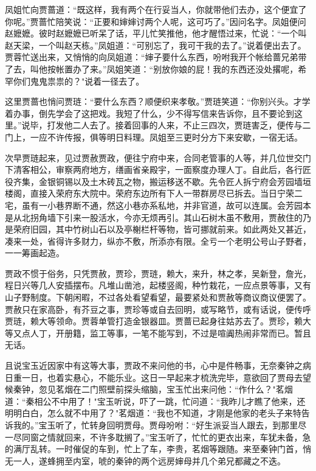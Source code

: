 凤姐忙向贾蔷道：“既这样，我有两个在行妥当人，你就带他们去办，这个便宜了你呢。”贾蔷忙陪笑说：“正要和婶婶讨两个人呢，这可巧了。”因问名字。凤姐便问赵嬷嬷。彼时赵嬷嬷已听呆了话，平儿忙笑推他，他才醒悟过来，忙说：“一个叫赵天梁，一个叫赵天栋。”凤姐道：“可别忘了，我可干我的去了。”说着便出去了。贾蓉忙送出来，又悄悄的向凤姐道：“婶子要什么东西，吩咐我开个帐给蔷兄弟带了去，叫他按帐置办了来。”凤姐笑道：“别放你娘的屁！我的东西还没处撂呢，希罕你们鬼鬼祟祟的？"说着一径去了。

这里贾蔷也悄问贾琏：“要什么东西？顺便织来孝敬。”贾琏笑道：“你别兴头。才学着办事，倒先学会了这把戏。我短了什么，少不得写信来告诉你，且不要论到这里。”说毕，打发他二人去了。接着回事的人来，不止三四次，贾琏害乏，便传与二门上，一应不许传报，俱等明日料理。凤姐至三更时分方下来安歇，一宿无话。

次早贾琏起来，见过贾赦贾政，便往宁府中来，合同老管事的人等，并几位世交门下清客相公，审察两府地方，缮画省亲殿宇，一面察度办理人丁。自此后，各行匠役齐集，金银铜锡以及土木砖瓦之物，搬运移送不歇。先令匠人拆宁府会芳园墙垣楼阁，直接入荣府东大院中。荣府东边所有下人一带群房尽已拆去。当日宁荣二宅，虽有一小巷界断不通，然这小巷亦系私地，并非官道，故可以连属。会芳园本是从北拐角墙下引来一股活水，今亦无烦再引。其山石树木虽不敷用，贾赦住的乃是荣府旧园，其中竹树山石以及亭榭栏杆等物，皆可挪就前来。如此两处又甚近，凑来一处，省得许多财力，纵亦不敷，所添亦有限。全亏一个老明公号山子野者，一一筹画起造。

贾政不惯于俗务，只凭贾赦，贾珍，贾琏，赖大，来升，林之孝，吴新登，詹光，程日兴等几人安插摆布。凡堆山凿池，起楼竖阁，种竹栽花，一应点景等事，又有山子野制度。下朝闲暇，不过各处看望看望，最要紧处和贾赦等商议商议便罢了。贾赦只在家高卧，有芥豆之事，贾珍等或自去回明，或写略节，或有话说，便传呼贾琏，赖大等领命。贾蓉单管打造金银器皿。贾蔷已起身往姑苏去了。贾珍，赖大等又点人丁，开册籍，监工等事，一笔不能写到，不过是喧阗热闹非常而已。暂且无话。

且说宝玉近因家中有这等大事，贾政不来问他的书，心中是件畅事，无奈秦钟之病日重一日，也着实悬心，不能乐业。这日一早起来才梳洗完毕，意欲回了贾母去望候秦钟，忽见茗烟在二门照壁前探头缩脑，宝玉忙出来问他：“作什么？"茗烟道：“秦相公不中用了！"宝玉听说，吓了一跳，忙问道：“我昨儿才瞧了他来，还明明白白，怎么就不中用了？"茗烟道：“我也不知道，才刚是他家的老头子来特告诉我的。”宝玉听了，忙转身回明贾母。贾母吩咐：“好生派妥当人跟去，到那里尽一尽同窗之情就回来，不许多耽搁了。”宝玉听了，忙忙的更衣出来，车犹未备，急的满厅乱转。一时催促的车到，忙上了车，李贵，茗烟等跟随。来至秦钟门首，悄无一人，遂蜂拥至内室，唬的秦钟的两个远房婶母并几个弟兄都藏之不迭。

